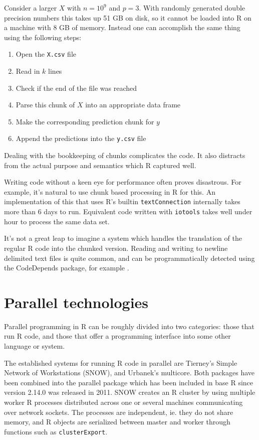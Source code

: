 \documentclass[12pt]{article}
\begin{document}
Consider a larger $X$ with $n = 10^{9}$ and $p = 3$. With randomly generated double
precision numbers this takes up 51 GB on disk, so it cannot be loaded into
R on a machine with 8 GB of memory. Instead one can accomplish the same
thing using the following steps:
\begin{enumerate}
    \item Open the \texttt{X.csv} file
    \item Read in $k$ lines
    \item Check if the end of the file was reached
    \item Parse this chunk of $X$ into an appropriate data frame
    \item Make the corresponding prediction chunk for $y$
    \item Append the predictions into the \texttt{y.csv} file
\end{enumerate}

Dealing with the bookkeeping of chunks complicates the code.  It also
distracts from the actual purpose and semantics which R captured well.

Writing code without a keen eye for performance often proves disastrous.
For example, it's natural to use chunk based processing in R for this. An
implementation of this that uses R's builtin \texttt{textConnection}
internally takes more than 6 days to run. Equivalent code written with
\texttt{iotools} takes well under hour to process the same data set.

It's not a great leap to imagine a system which handles the translation
of the regular R code into the chunked version. Reading and writing
to newline delimited text files is quite common, and can be
programmatically detected using the CodeDepends package, for example
\cite{R-CodeDepends}.

\section{Parallel technologies}

Parallel programming in R can be roughly divided into two categories: those
that run R code, and those that offer a programming interface into some
other language or system. 

The established systems for running R code in parallel are Tierney's Simple
Network of Workstations (SNOW), and Urbanek's multicore. Both packages have
been combined into the parallel package which has been included in base R since
version 2.14.0 was released in 2011. SNOW creates
an R cluster by using multiple worker R processes distributed across one or
several machines communicating over network sockets. The processes are independent,
ie. they do not share memory, and R objects are serialized
between master and worker through functions such as \texttt{clusterExport}.
\end{document}
